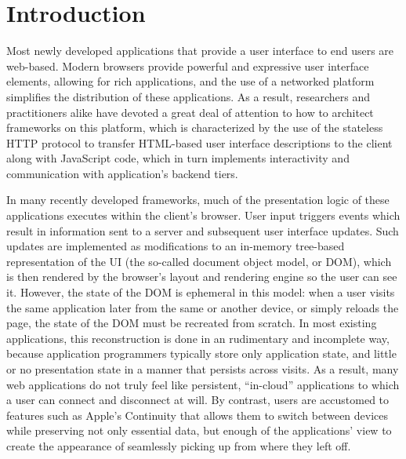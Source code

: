 %
%
\section{Introduction}
\label{sec:intro}

Most newly developed applications that provide a user interface to end users 
are web-based.  Modern browsers provide powerful and expressive user interface 
elements, allowing for rich applications, and the use of a networked
platform simplifies the distribution of these applications.  As a result,
researchers and practitioners alike have devoted a great deal of attention to
how to architect frameworks on this platform, which is characterized by the
use of the stateless HTTP protocol to transfer HTML-based user interface 
descriptions to the client along with JavaScript code, which in turn 
implements interactivity and communication with application's backend tiers.

In many recently developed frameworks, much of the presentation logic of these applications
executes within the client's browser.  User input triggers events
which result in information sent to a server and subsequent user interface updates.
Such updates are implemented as modifications to an in-memory tree-based
representation of the UI (the so-called document object model, or DOM), which
is then rendered by the browser's layout and rendering engine so the user can see it.
However, the state of the DOM is ephemeral in this model: when a user visits 
the same application later from the same or another device, or simply reloads the page, the state of the
DOM must be recreated from scratch.  In most existing applications, this 
reconstruction is done in an rudimentary and incomplete way, because
application programmers typically store only application state, and little 
or no presentation state in a manner that persists across visits.
As a result, many web applications do not truly feel like persistent,
``in-cloud'' applications to which a user can connect and disconnect at will.
By contrast, users are accustomed to features such as Apple's Continuity\cite{apple-continuity}
that allows them to switch between devices while preserving not only 
essential data, but enough of the applications' view to create the appearance
of seamlessly picking up from where they left off.

